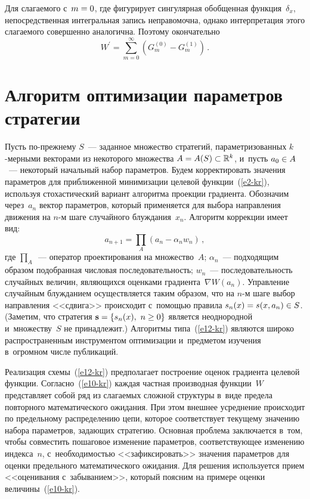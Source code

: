 \begin{multicols}{2}
  Для слагаемого с~$m\hm=0$, где фигурирует сингулярная обобщенная 
функция~$\delta_x$, непосредственная интегральная запись неправомочна, 
однако интерпретация этого слагаемого совершенно аналогична. Поэтому 
окончательно
  \begin{equation*}
  W^\prime= \sum\limits^\infty_{m=0} \left( G_m^{(0)} -G_m^{(1)}\right)\,.
  \end{equation*}
  
  \section{Алгоритм оптимизации параметров стратегии}
  
  Пусть по-прежнему $S$~--- заданное множество стратегий, 
параметризованных $k$-мер\-ны\-ми векторами из некоторого множества 
$A\hm= A(S)\hm\subset \mathbb{R}^k$, и~пусть $a_0\hm\in A$~--- некоторый 
начальный набор па\-ра\-мет\-ров. Будем корректировать значения параметров 
для приближенной минимизации целевой функции~(\ref{e2-kr}), используя 
стохастический вариант алгоритма проекции градиента. Обозначим 
через~$a_n$ вектор па\-ра\-мет\-ров, который применяется для выбора 
на\-прав\-ле\-ния движения на $n$-м шаге случайного блуж\-да\-ния~$x_n$. 
Алгоритм коррекции имеет вид:
  \begin{equation}
  a_{n+1}=\prod\limits_A \left( a_n-\alpha_n w_n\right)\,,
  \label{e12-kr}
  \end{equation}
где $\prod_A$~--- оператор проектирования на множество~$A$;  
$\alpha_n$~--- подходящим образом подобранная чис\-ло\-вая 
по\-сле\-до\-ва\-тель\-ность; $w_n$~--- по\-сле\-до\-ва\-тель\-ность случайных величин, 
являющихся оценками градиента~$\nabla W(a_n)$. Управление случайным 
блуж\-да\-ни\-ем осуществляется таким образом, что на $n$-м шаге выбор 
направления <<сдвига>> происходит с~по\-мощью правила $s_n(x)\hm= 
s(x,a_n)\hm\in S$. (Заметим, что стратегия $\mathbf{s}\hm= \{ s_n(x),\ n\geq 0\}$ 
является неоднородной и~множеству~$S$ не принадлежит.) Алгоритмы 
типа~(\ref{e12-kr}) являются широко распространенным инструментом 
оптимизации и~предметом изучения в~огромном чис\-ле пуб\-ли\-каций.

  Реализация схемы~(\ref{e12-kr}) предполагает по\-стро\-ение оценок 
градиента целевой функции. Согласно~(\ref{e10-kr}) каждая частная 
производная функции~$W$ пред\-став\-ля\-ет собой ряд из сла\-га\-емых слож\-ной 
структуры в~виде предела повторного математического ожидания. При этом 
внешнее усреднение происходит по предельному распределению цепи, 
которое соответствует текущему значению набора параметров, за\-да\-ющих 
стратегию. Основная проб\-ле\-ма заключается в~том, чтобы совместить 
пошаговое изменение па\-ра\-мет\-ров, соответствующее изменению 
индекса~$n$, с~необходимостью <<зафиксировать>> значения па\-ра\-мет\-ров 
для оценки предельного математического ожидания. Для решения 
используется прием <<оценивания с~забыванием>>, который поясним на 
примере оценки величины~(\ref{e10-kr}).
  

\end{multicols}
